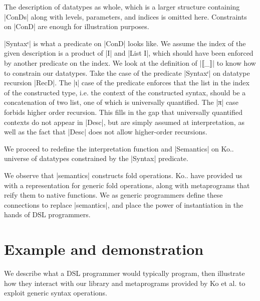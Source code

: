 \documentclass[sigplan,review,fleqn]{acmart}
\renewcommand{\verb}{\collectverb{\color{AgdaFunction}}}
\newcommand{\con}{\collectverb{\color{AgdaInductiveConstructor}}}
\begin{document}
The description of datatypes as whole, which is a larger structure containing \verb|ConDs| along with levels, parameters, and indices is omitted here.
Constraints on \verb|ConD| are enough for illustration purposes.

\verb|Syntaxᶜ| is what a predicate on \verb|ConD| looks like.
We assume the index of the given description is a product of \verb|I| and \verb|List I|, which should have been enforced by another predicate on the index.
We look at the definition of \verb|⟦_⟧| to know how to constrain our datatypes.
Take the case of the predicate \verb|Syntaxʳ| on datatype recursion \verb|RecD|.
The \con|ι| case of the predicate enforces that the list in the index of the constructed type, i.e. the context of the constructed syntax, should be a concatenation of two list, one of which is universally quantified.
The \con|π| case forbids higher order recursion.
This fills in the gap that universally quantified contexts do not appear in \verb|Desc|, but are simply assumed at interpretation, as well as the fact that \verb|Desc| does not allow higher-order recursions.

We proceed to redefine the interpretation function and \verb|Semantics| on Ko.. universe of datatypes constrained by the \verb|Syntax| predicate.

We observe that \verb|semantics| constructs fold operations.
Ko.. have provided us with a representation for generic fold operations, along with metaprograms that reify them to native functions.
We as generic programmers define these connections to replace \verb|semantics|, and place the power of instantiation in the hands of DSL programmers.

\section{Example and demonstration}
We describe what a DSL programmer would typically program, then illustrate how they interact with our library and metaprograms provided by Ko et al. to exploit generic syntax operations.
\end{document}
